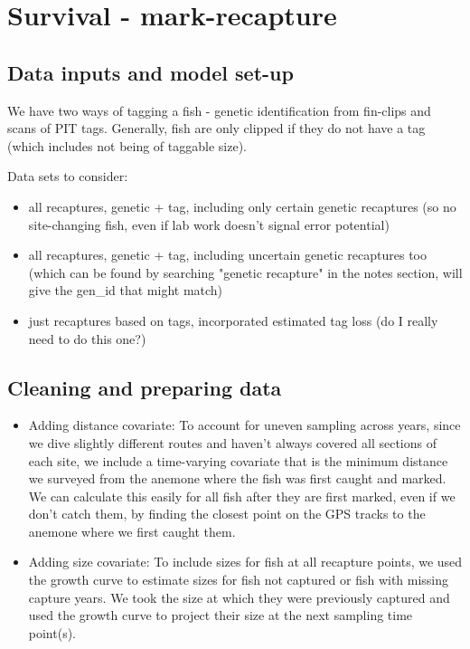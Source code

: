 \documentclass[12pt, oneside]{article}   	%
\begin{document}
\section*{Survival - mark-recapture}
\subsection*{Data inputs and model set-up}
We have two ways of tagging a fish - genetic identification from fin-clips and scans of PIT tags. Generally, fish are only clipped if they do not have a tag (which includes not being of taggable size).

Data sets to consider:
\begin{itemize}
	\item all recaptures, genetic + tag, including only certain genetic recaptures (so no site-changing fish, even if lab work doesn't signal error potential)
	\item all recaptures, genetic + tag, including uncertain genetic recaptures too (which can be found by searching "genetic recapture" in the notes section, will give the gen\_id that might match)
	\item just recaptures based on tags, incorporated estimated tag loss (do I really need to do this one?)
\end{itemize}

\subsection*{Cleaning and preparing data}
\begin{itemize}
	\item Adding distance covariate: To account for uneven sampling across years, since we dive slightly different routes and haven't always covered all sections of each site, we include a time-varying covariate that is the minimum distance we surveyed from the anemone where the fish was first caught and marked. We can calculate this easily for all fish after they are first marked, even if we don't catch them, by finding the closest point on the GPS tracks to the anemone where we first caught them.
	\item Adding size covariate: To include sizes for fish at all recapture points, we used the growth curve to estimate sizes for fish not captured or fish with missing capture years. We took the size at which they were previously captured and used the growth curve to project their size at the next sampling time point(s).
\end{itemize}
\end{document}
